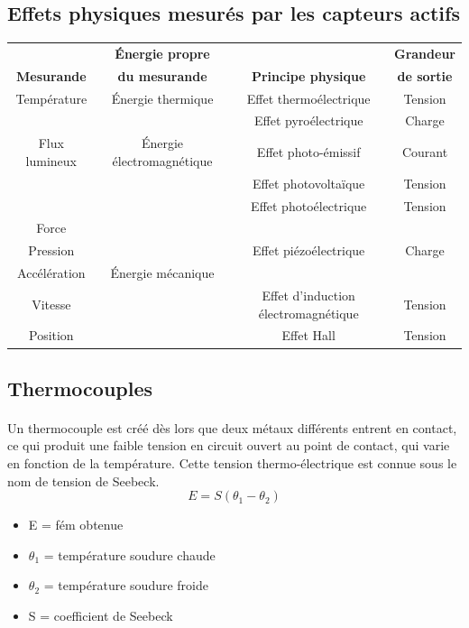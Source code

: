 \documentclass{article}
\begin{document}
\subsection{Effets physiques mesurés par les capteurs actifs}
\begin{table}[H]
    \centering
    \begin{tabular}{c c c c}
        & \textbf{Énergie propre} & & \textbf{Grandeur}\\
        \textbf{Mesurande} & \textbf{du mesurande} & \textbf{Principe physique} & \textbf{de sortie}\\
        \hline
        Température & Énergie thermique & Effet thermoélectrique & Tension\\
         &  & Effet pyroélectrique & Charge\\
        \hline
        Flux lumineux & Énergie électromagnétique & Effet photo-émissif & Courant\\
        &  & Effet photovoltaïque & Tension\\
        &  & Effet photoélectrique & Tension\\
        \hline
        Force & & & \\
        Pression & & Effet piézoélectrique & Charge \\
        Accélération & Énergie mécanique & & \\
        Vitesse & & Effet d'induction électromagnétique & Tension \\
        Position & & Effet Hall & Tension \\
    \end{tabular}
\end{table}

\subsection{Thermocouples}
\paragraph{}
Un thermocouple est créé dès lors que deux métaux différents entrent en contact, ce qui produit une faible tension en circuit ouvert au point de contact, qui varie en fonction de la température. Cette tension thermo-électrique est connue sous le nom de tension de Seebeck.
$$E = S (\theta_1 - \theta_2)$$
\begin{itemize}
    \item E = fém obtenue
    \item $\theta_1$ = température soudure chaude
    \item $\theta_2$ = température soudure froide
    \item S = coefficient de Seebeck
\end{itemize}
\end{document}

